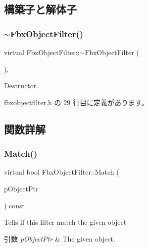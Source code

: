\subsection{構築子と解体子}
\mbox{\label{class_fbx_object_filter_a811d3a582860aaebe5d8008496fc6954}} 
\subsubsection{\texorpdfstring{$\sim$\+Fbx\+Object\+Filter()}{~FbxObjectFilter()}}
{\footnotesize\ttfamily virtual Fbx\+Object\+Filter\+::$\sim$\+Fbx\+Object\+Filter (\begin{DoxyParamCaption}{ }\end{DoxyParamCaption})\hspace{0.3cm}{\ttfamily [inline]}, {\ttfamily [virtual]}}



Destructor. 



 fbxobjectfilter.\+h の 29 行目に定義があります。



\subsection{関数詳解}
\mbox{\label{class_fbx_object_filter_a49cc7b7c109f98910241d62ec0bd093b}} 
\subsubsection{\texorpdfstring{Match()}{Match()}}
{\footnotesize\ttfamily virtual bool Fbx\+Object\+Filter\+::\+Match (\begin{DoxyParamCaption}\item[{const \hyperlink{class_fbx_object}{Fbx\+Object} $\ast$}]{p\+Object\+Ptr }\end{DoxyParamCaption}) const\hspace{0.3cm}{\ttfamily [pure virtual]}}

Tells if this filter match the given object 
\begin{DoxyParams}{引数}
{\em p\+Object\+Ptr} & The given object. \\
\hline
\end{DoxyParams}


